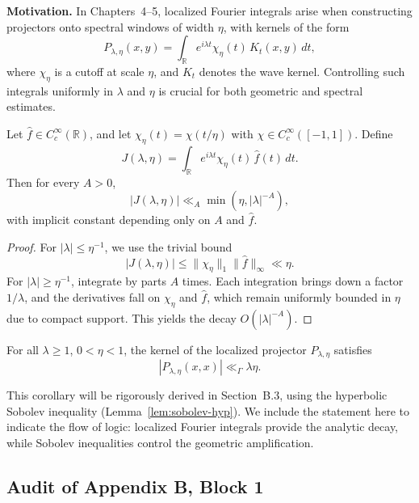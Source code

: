 \noindent
\textbf{Motivation.}
In Chapters~4--5, localized Fourier integrals arise when constructing projectors
onto spectral windows of width $\eta$, with kernels of the form
\[
P_{\lambda,\eta}(x,y) = \int_{\mathbb R} e^{i\lambda t} \chi_\eta(t)\, K_t(x,y)\,dt,
\]
where $\chi_\eta$ is a cutoff at scale $\eta$, and $K_t$ denotes the wave kernel.
Controlling such integrals uniformly in $\lambda$ and $\eta$ is crucial for both
geometric and spectral estimates.

\begin{lemma}\label{lem:decay-local}
Let $\hat{f}\in C_c^\infty(\mathbb R)$, and let $\chi_\eta(t) = \chi(t/\eta)$
with $\chi \in C_c^\infty([-1,1])$. Define
\[
J(\lambda,\eta) = \int_{\mathbb R} e^{i\lambda t} \chi_\eta(t)\, \hat{f}(t)\,dt.
\]
Then for every $A>0$,
\[
|J(\lambda,\eta)| \ll_A \min(\eta, |\lambda|^{-A}),
\]
with implicit constant depending only on $A$ and $\hat{f}$.
\end{lemma}

\begin{proof}
For $|\lambda| \le \eta^{-1}$, we use the trivial bound
\[
|J(\lambda,\eta)| \le \|\chi_\eta\|_1 \|\hat{f}\|_\infty \ll \eta.
\]
For $|\lambda| \ge \eta^{-1}$, integrate by parts $A$ times. Each integration
brings down a factor $1/\lambda$, and the derivatives fall on $\chi_\eta$ and
$\hat{f}$, which remain uniformly bounded in $\eta$ due to compact support.
This yields the decay $O(|\lambda|^{-A})$.
\end{proof}

\begin{corollary}\label{cor:localized}
For all $\lambda \ge 1$, $0<\eta<1$, the kernel of the localized projector
$P_{\lambda,\eta}$ satisfies
\[
|P_{\lambda,\eta}(x,x)| \ll_\Gamma \lambda \eta.
\]
\end{corollary}

\begin{remark}
This corollary will be rigorously derived in Section~B.3, using the hyperbolic Sobolev
inequality (Lemma~\ref{lem:sobolev-hyp}). We include the statement here to indicate the
flow of logic: localized Fourier integrals provide the analytic decay, while Sobolev
inequalities control the geometric amplification.
\end{remark}

\subsection*{Audit of Appendix B, Block 1}

